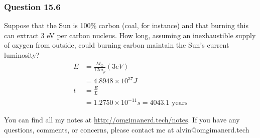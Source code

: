 \documentclass{math}
\begin{document}
\subsubsection*{Question 15.6}
Suppose that the Sun is 100\% carbon (coal, for instance) and that burning this
can extract 3 eV per carbon nucleus. How long, assuming an inexhaustible
supply of oxygen from outside, could burning carbon maintain the Sun's current
luminosity?
\begin{align*}
  E &= \frac{M_{\odot}}{12m_p}(3 eV) \\
  &= 4.8948\times10^{37}J \\
  t &= \frac{E}{L} \\
  &= 1.2750\times10^{-11}s = 4043.1\text{ years}
\end{align*}

\begin{center}
  You can find all my notes at \url{http://omgimanerd.tech/notes}. If you have
  any questions, comments, or concerns, please contact me at
  alvin@omgimanerd.tech
\end{center}
\end{document}
